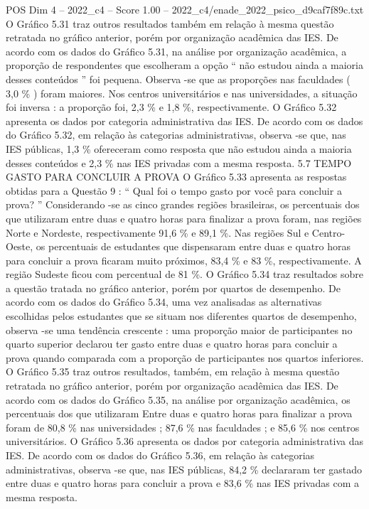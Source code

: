\begin{textsample}{POS Dim 4 – 2022\_c4 – Score 1.00 – 2022\_c4/enade\_2022\_psico\_d9caf7f89c.txt}
O Gráfico 5.31 traz outros resultados também em relação à mesma questão retratada no gráfico anterior, porém por organização acadêmica das IES.
De acordo com os dados do Gráfico 5.31, na análise por organização acadêmica, a proporção de respondentes que escolheram a opção “ não estudou ainda a maioria desses conteúdos ” foi pequena.
Observa -se que as proporções nas faculdades ( 3,0 \% ) foram maiores.
Nos centros universitários e nas universidades, a situação foi inversa : a proporção foi, 2,3 \% e 1,8 \%, respectivamente.
O Gráfico 5.32 apresenta os dados por categoria administrativa das IES.
De acordo com os dados do Gráfico 5.32, em relação às categorias administrativas, observa -se que, nas IES públicas, 1,3 \% ofereceram como resposta que não estudou ainda a maioria desses conteúdos e 2,3 \% nas IES privadas com a mesma resposta. 5.7 TEMPO GASTO PARA CONCLUIR A PROVA O Gráfico 5.33 apresenta as respostas obtidas para a Questão 9 : “ Qual foi o tempo gasto por você para concluir a prova? ” Considerando -se as cinco grandes regiões brasileiras, os percentuais dos que utilizaram entre duas e quatro horas para finalizar a prova foram, nas regiões Norte e Nordeste, respectivamente 91,6 \% e 89,1 \%.
Nas regiões Sul e Centro-Oeste, os percentuais de estudantes que dispensaram entre duas e quatro horas para concluir a prova ficaram muito próximos, 83,4 \% e 83 \%, respectivamente.
A região Sudeste ficou com percentual de 81 \%.
O Gráfico 5.34 traz resultados sobre a questão tratada no gráfico anterior, porém por quartos de desempenho.
De acordo com os dados do Gráfico 5.34, uma vez analisadas as alternativas escolhidas pelos estudantes que se situam nos diferentes quartos de desempenho, observa -se uma tendência crescente : uma proporção maior de participantes no quarto superior declarou ter gasto entre duas e quatro horas para concluir a prova quando comparada com a proporção de participantes nos quartos inferiores.
O Gráfico 5.35 traz outros resultados, também, em relação à mesma questão retratada no gráfico anterior, porém por organização acadêmica das IES.
De acordo com os dados do Gráfico 5.35, na análise por organização acadêmica, os percentuais dos que utilizaram Entre duas e quatro horas para finalizar a prova foram de 80,8 \% nas universidades ; 87,6 \% nas faculdades ; e 85,6 \% nos centros universitários.
O Gráfico 5.36 apresenta os dados por categoria administrativa das IES.
De acordo com os dados do Gráfico 5.36, em relação às categorias administrativas, observa -se que, nas IES públicas, 84,2 \% declararam ter gastado entre duas e quatro horas para concluir a prova e 83,6 \% nas IES privadas com a mesma resposta.

\end{textsample}
